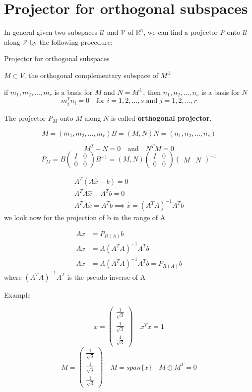\chapter{Projector for orthogonal subspaces}
In general given two subspaces \( \mathcal{U} \) and \( \mathcal{V} \) of \( \mathbb{R}^n \), we can find a projector \( P \) onto \( \mathcal{U} \) along \( \mathcal{V} \) by the following procedure:


Projector for orthogonal subspaces

$M \subset V$, the orthogonal complementary subspace of $M^{\perp}$

if $m_1, m_2, \ldots, m_r$ is a basis for $M$ and $N=M^{\perp}$, then $n_1, n_2, \ldots, n_s$ is a basis for $N$
$$ m_j^Tn_i = 0 \quad \text{for } i=1,2,\ldots,s \text{ and } j=1,2,\ldots,r $$

The projector $P_M$ onto $M$ along $N$ is called \textbf{orthogonal projector}.

$$
M = (m_1, m_2, \ldots, m_r) B = (M, N)
N = (n_1, n_2, \ldots, n_s)
$$

$$
M^T - N = 0 \quad \text{and} \quad N^T M = 0
$$
$$
P_M = B\begin{pmatrix}
I & 0 \\
0 & 0
\end{pmatrix}B^{-1} = (M, N)\begin{pmatrix}
I & 0 \\
0 & 0
\end{pmatrix}\begin{pmatrix}
M & N
\end{pmatrix}^{-1}
$$

$$
\begin{aligned}
    A^T(A\hat{x} - b) = 0 \\
    A^TA\hat{x} - A^Tb = 0 \\
    A^TA\hat{x} = A^Tb \implies \hat{x} = (A^TA)^{-1}A^Tb    
\end{aligned}
$$
we look now for the projection of b in the range of A


$$
\begin{aligned}
Ax &= P_{R(A)}b \\
Ax &= A(A^TA)^{-1}A^Tb \\
Ax &= A(A^TA)^{-1}A^Tb = P_{R(A)}b
\end{aligned}
$$
where $(A^TA)^{-1}A^T$ is the pseudo inverse of A

Example

$$
x = \begin{pmatrix}
    \frac{1}{\sqrt{3}} \\
    \frac{1}{\sqrt{3}} \\
    \frac{1}{\sqrt{3}}
\end{pmatrix} \quad
x^Tx = 1
$$
$$
M = \begin{pmatrix}
    \frac{1}{\sqrt{3}} \\
    \frac{1}{\sqrt{3}} \\
    \frac{1}{\sqrt{3}}
\end{pmatrix} \quad M = span\{x\} \quad M \oplus M^T = 0
$$


